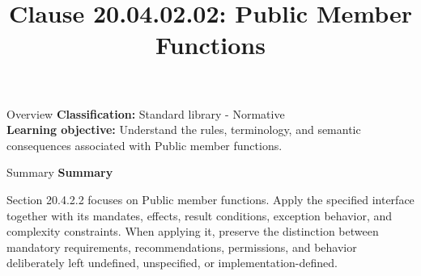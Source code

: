 \documentclass[10pt,letterpaper]{article}
\title{Clause 20.04.02.02: Public Member Functions}
\author{}
\date{}
\begin{document}
\maketitle
\begin{CornellOverviewBox}{Overview}
\textbf{Classification:} Standard library - Normative\\[2pt]
\textbf{Learning objective:} Understand the rules, terminology, and semantic consequences associated with Public member functions.
\end{CornellOverviewBox}\begin{CornellSummaryBox}{Summary}
{\sffamily\bfseries\color{Accent} Summary}\par\vspace{3pt}Section 20.4.2.2 focuses on Public member functions. Apply the specified interface together with its mandates, effects, result conditions, exception behavior, and complexity constraints. When applying it, preserve the distinction between mandatory requirements, recommendations, permissions, and behavior deliberately left undefined, unspecified, or implementation-defined.
\end{CornellSummaryBox}
\end{document}
